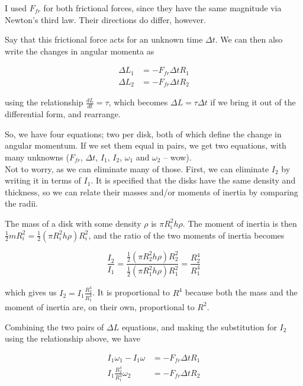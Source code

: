 \documentclass[8.01x]{subfiles}
\begin{document}
I used $F_{fr}$ for both frictional forces, since they have the same magnitude via Newton's third law. Their directions do differ, however.

Say that this frictional force acts for an unknown time $\Delta t$. We can then also write the changes in angular momenta as

\begin{align}
\Delta L_1 &= - F_{fr} \Delta t R_1\\
\Delta L_2 &= - F_{fr} \Delta t R_2
\end{align}

using the relationship $\displaystyle \frac{dL}{dt} = \tau$, which becomes $\Delta L = \tau \Delta t$ if we bring it out of the differential form, and rearrange.

So, we have four equations; two per disk, both of which define the change in angular momentum. If we set them equal in pairs, we get two equations, with many unknowns ($F_{fr}$, $\Delta t$, $I_1$, $I_2$, $\omega_1$ and $\omega_2$ -- wow).\\
Not to worry, as we can eliminate many of those. First, we can eliminate $I_2$ by writing it in terms of $I_1$. It is specified that the disks have the same density and thickness, so we can relate their masses and/or moments of inertia by comparing the radii.

The mass of a disk with some density $\rho$ is $\pi R_i^2 h \rho$. The moment of inertia is then $\frac{1}{2} m R_i^2 = \frac{1}{2} (\pi R_i^2 h \rho) R_i^2$, and the ratio of the two moments of inertia becomes 

\begin{equation}
\frac{I_2}{I_1} = \frac{\frac{1}{2} (\pi R_2^2 h \rho) R_2^2}{\frac{1}{2} (\pi R_1^2 h \rho) R_1^2} = \frac{R_2^4}{R_1^4}
\end{equation}

which gives us $\displaystyle I_2 = I_1 \frac{R_2^4}{R_1^4}$. It is proportional to $R^4$ because both the mass and the moment of inertia are, on their own, proportional to $R^2$.

Combining the two pairs of $\Delta L$ equations, and making the substitution for $I_2$ using the relationship above, we have

\begin{align}
I_1 \omega_1 - I_1 \omega &= - F_{fr} \Delta t R_1\\
I_1 \frac{R_2^4}{R_1^4} \omega_2 &= - F_{fr} \Delta t R_2
\end{align}
\end{document}
